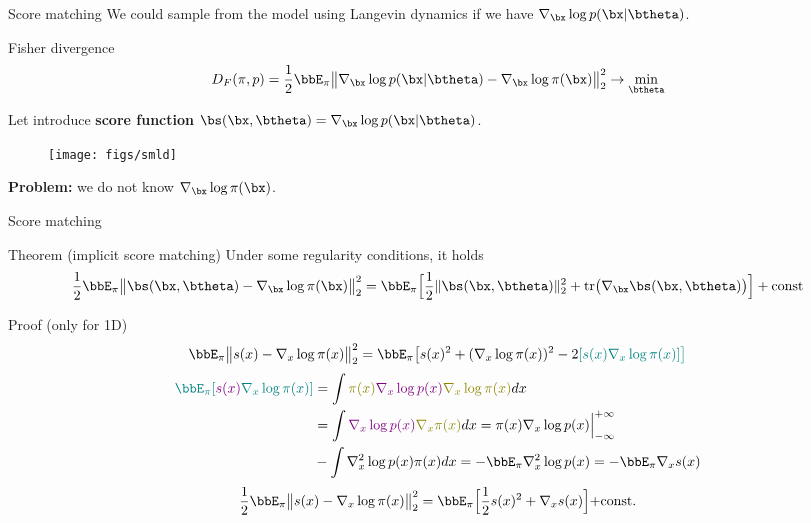 \begin{frame}{Score matching}
	We could sample from the model using Langevin dynamics if we have $\nabla_{\bx}\log p(\bx| \btheta)$.
	\begin{block}{Fisher divergence}
		\vspace{-0.3cm}
		\[
		D_F(\pi, p) = \frac{1}{2}\bbE_{\pi}\bigl\| \nabla_{\bx}\log p(\bx| \btheta) - \nabla_\bx \log \pi(\bx) \bigr\|^2_2 \rightarrow \min_{\btheta}
		\]
		\vspace{-0.5cm}
	\end{block}
	Let introduce \textbf{score function} $\bs(\bx, \btheta) = \nabla_{\bx}\log p(\bx| \btheta)$. 
	\vspace{-0.2cm}
	\begin{figure}
		\centering
		\texttt{[image: figs/smld]}
	\end{figure}
	\vspace{-0.3cm} 
	\textbf{Problem:} we do not know $\nabla_\bx \log \pi(\bx)$.
\end{frame}
\begin{frame}{Score matching}
	\begin{block}{Theorem (implicit score matching)}
		Under some regularity conditions, it holds
		\vspace{-0.2cm}
		\[
		\frac{1}{2} \bbE_{\pi}\bigl\| \bs(\bx, \btheta) - \nabla_\bx \log \pi(\bx) \bigr\|^2_2 = \bbE_{\pi}\Bigr[ \frac{1}{2}\| \bs(\bx, \btheta) \|_2^2 + \text{tr}\bigl(\nabla_{\bx} \bs(\bx, \btheta)\bigr) \Bigr] + \text{const}
		\]
		\vspace{-0.6cm}
	\end{block}
	\begin{block}{Proof (only for 1D)}
		\vspace{-0.6cm}
		{\small
			\begin{multline*}
				\bbE_{\pi}\bigl\| s(x) - \nabla_x \log \pi(x) \bigr\|^2_2 = \bbE_{\pi} \bigl[ s(x)^2 + (\nabla_x \log \pi(x))^2 - 2{\color{teal}[s(x) \nabla_x \log \pi(x) ] \bigr] }
			\end{multline*}
			\vspace{-0.8cm}
			\begin{align*}
				{\color{teal}\bbE_{\pi} [{\color{violet}s(x) } \nabla_x \log \pi(x) ] } &= \int {\color{olive}\pi(x) {\color{violet}\nabla_x \log p(x)} \nabla_x \log \pi(x)} d x \\ 
				&= \int {\color{violet}\nabla_x \log p(x) } {\color{olive}\nabla_x \pi(x) } dx = \Bigl.\pi(x) \nabla_x \log p(x) \Bigr|_{-\infty}^{+\infty} \\
				&- \int \nabla^2_x \log p(x)  \pi(x) dx =- \bbE_{\pi} \nabla^2_x \log p(x) =- \bbE_{\pi} \nabla_x s(x)
			\end{align*}
			\[
			\frac{1}{2} \bbE_{\pi}\bigl\| s(x) - \nabla_x \log \pi(x) \bigr\|^2_2 = \bbE_{\pi} \Bigr[\frac{1}{2} s(x)^2 + \nabla_x s(x) \Bigl]+ \text{const}.
			\]
		}
	\end{block}
\end{frame}

